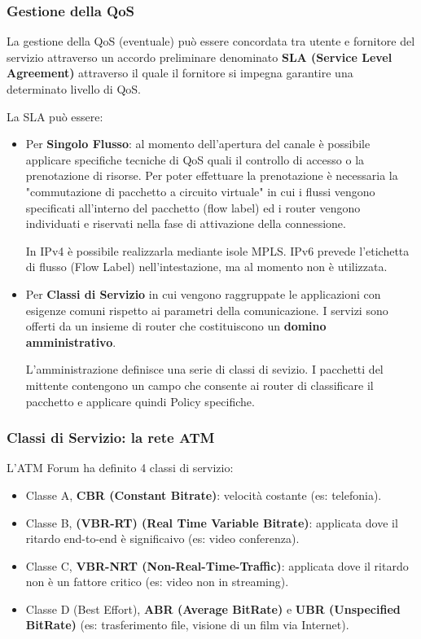         \subsubsection{Gestione della QoS}
            La gestione della QoS (eventuale) può essere concordata tra utente e fornitore del servizio attraverso un accordo preliminare denominato \textbf{SLA (Service Level Agreement)} attraverso il quale il fornitore si impegna garantire una determinato livello di QoS.
        
            La SLA può essere:
            \begin{itemize}
                \item Per \textbf{Singolo Flusso}: al momento dell'apertura del canale è possibile applicare specifiche tecniche di QoS quali il controllo di accesso o la prenotazione di risorse. Per poter effettuare la prenotazione è necessaria la "commutazione di pacchetto a circuito virtuale" in cui i flussi vengono specificati all'interno del pacchetto (flow label) ed i router vengono individuati e riservati nella fase di attivazione della connessione.
                
                In IPv4 è possibile realizzarla mediante isole MPLS. IPv6 prevede l'etichetta di flusso (Flow Label) nell'intestazione, ma al momento non è utilizzata.
                \item Per \textbf{Classi di Servizio} in cui vengono raggruppate le applicazioni con esigenze comuni rispetto ai parametri della comunicazione. I servizi sono offerti da un insieme di router che costituiscono un \textbf{domino amministrativo}.

                L'amministrazione definisce una serie di classi di sevizio. I pacchetti del mittente contengono un campo che consente ai router di classificare il pacchetto e applicare quindi Policy specifiche.
            \end{itemize}
        
        \subsubsection{Classi di Servizio: la rete ATM}
            L'ATM Forum ha definito 4 classi di servizio:
            \begin{itemize}
                \item Classe A, \textbf{CBR (Constant Bitrate)}: velocità costante (es: telefonia).
                \item Classe B, \textbf{(VBR-RT) (Real Time Variable Bitrate)}: applicata dove il ritardo end-to-end è significaivo (es: video conferenza).
                \item Classe C, \textbf{VBR-NRT (Non-Real-Time-Traffic)}: applicata dove il ritardo non è un fattore critico (es: video non in streaming).
                \item Classe D (Best Effort), \textbf{ABR (Average BitRate)} e \textbf{UBR (Unspecified BitRate)} (es: trasferimento file, visione di un film via Internet).
            \end{itemize}

